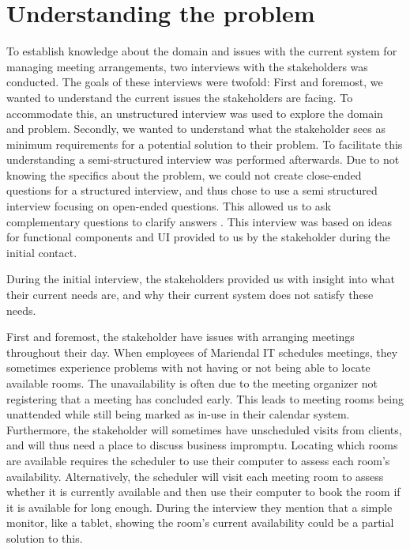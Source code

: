 \section{Understanding the problem}\label{sec:understanding_the_problem} %
To establish knowledge about the domain and issues with the current system for managing meeting arrangements, two interviews with the stakeholders was conducted.  
The goals of these interviews were twofold: 
First and foremost, we wanted  to understand the current issues the stakeholders are facing. 
To accommodate this, an unstructured interview was used to explore the domain and problem\cite{robson2002real}.
Secondly, we wanted to understand what the stakeholder sees as minimum requirements for a potential solution to their problem. 
To facilitate this understanding a semi-structured interview was performed afterwards. 
Due to not knowing the specifics about the problem, we could not create close-ended questions for a structured interview, and thus chose to use a semi structured interview focusing on open-ended questions. This allowed us to ask complementary questions to clarify answers \cite{InterviewsNHS}.
This interview was based on ideas for functional components and UI provided to us by the stakeholder during the initial contact.


During the initial interview, the stakeholders provided us with insight into what their current needs are, and why their current system does not satisfy these needs.

First and foremost, the stakeholder have issues with arranging meetings throughout their day.
When employees of Mariendal IT schedules meetings, they sometimes experience problems with not having or not being able to locate available rooms.
The unavailability is often due to the meeting organizer not registering that a meeting has concluded early.
This leads to meeting rooms being unattended while still being marked as in-use in their calendar system.
Furthermore, the stakeholder will sometimes have unscheduled visits from clients, and will thus need a place to discuss business impromptu. 
Locating which rooms are available requires the scheduler to use their computer to assess each room's availability.
Alternatively, the scheduler will visit each meeting room to assess whether it is currently available and then use their computer to book the room if it is available for long enough.
During the interview they mention that a simple monitor, like a tablet, showing the room's current availability could be a partial solution to this.

